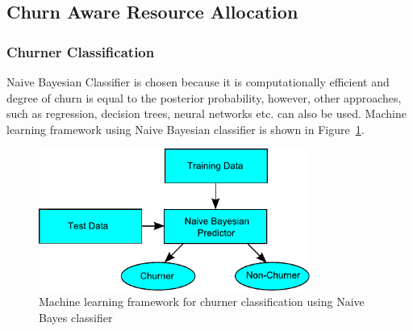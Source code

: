 \subsection{Churn Aware Resource Allocation}

\subsubsection{Churner Classification}
Naive Bayesian Classifier is chosen because it is computationally efficient and degree of churn is equal to the posterior probability, however, other approaches, such as regression, decision trees, neural networks etc. can also be used. Machine learning framework using Naive Bayesian classifier is shown in Figure~\ref{classification}.
\begin{figure}[!h]
\centering
\includegraphics[width=3.5in]{pic/classification.pdf}
\caption{Machine learning framework for churner classification using Naive Bayes classifier}
\label{classification}
\end{figure}

